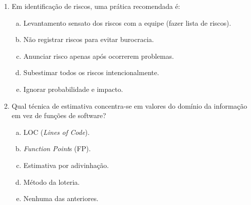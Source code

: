 \documentclass{beamer}
\begin{document}
\begin{frame}
    \begin{enumerate}
        \justifying
        \setcounter{enumi}{24}
        \item<1-2> Em identificação de riscos, uma prática recomendada é:
        \begin{enumerate}[a)]
            \justifying
            \item<1-2> \alert<2>{Levantamento sensato dos riscos com a equipe (fazer lista de riscos)}.
            \item<1-2> Não registrar riscos para evitar burocracia.
            \item<1-2> Anunciar risco apenas após ocorrerem problemas.
            \item<1-2> Subestimar todos os riscos intencionalmente.
            \item<1-2> Ignorar probabilidade e impacto.
        \end{enumerate}
        \item<3-4> Qual técnica de estimativa concentra-se em valores do domínio da informação em vez de funções de software?
        \begin{enumerate}[a)]
            \justifying
            \item<3-4> LOC (\textit{Lines of Code}).
            \item<3-4> \alert<4>{\textit{Function Point}s (FP)}.
            \item<3-4> Estimativa por adivinhação.
            \item<3-4> Método da loteria.
            \item<3-4> Nenhuma das anteriores.
        \end{enumerate}
    \end{enumerate}
\end{frame}
\end{document}
